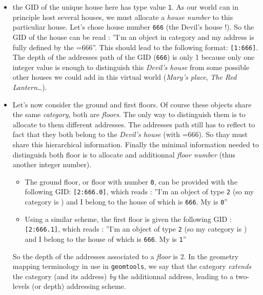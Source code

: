 \begin{itemize}

\item the GID of the unique  house here has type value \texttt{1}.  As
  our world can  in principle host several houses,  we must allocate a
  \emph{house  number} to  this particuliar  house. Let's  chose house
  number \texttt{666} (the  Devil's house !). So the  GID of the house
  can be read : ''I'm an  object in category  and my address
  is fully defined by the =666''. This should lead to
  the following  format: \verb+[1:666]+.   The depth of  the addresses
  path of the  GID (\texttt{666}) is only 1 because only one  integer value is enough
  to distinguish this \emph{Devil's house} from some possible other houses
  we could add in this virtual world (\emph{Mary's place}, \emph{The Red Lantern}\dots).

\item Let's now consider the ground and first floors. Of course these
  objects share the same \emph{category}, both are \emph{floors}.  The
  only  way to  distinguish  them  is to  allocate  to them  different
  addresses.  The  addresses path  still has to  reflect to  fact that
  they    both   belong    to   the    \emph{Devil's    house}   (with
  =666).   So  thay  must  share  this  hierarchical
  information. Finally  the minimal information  needed to distinguish
  both floor is to  allocate and additionnal \emph{floor number} (thus
  another integer number).
  \begin{itemize}
 
  \item  The ground  floor, or  floor with  number \texttt{0},  can be
    provided with  the following GID: \verb+[2:666.0]+,  which reads :
    ''I'm an object of type  \texttt{2} (so my category is )
    and  I  belong  to   the  house  of  which    is
    \texttt{666}.  My  is \texttt{0}''

  \item  Using  a  similar  scheme,  the first  floor  is  given  the
    following GID : \verb+[2:666.1]+, which reads : ''I'm an object of
    type \texttt{2} (so my category is ) and I belong to the
    house   of   which      is   \texttt{666}.    My
     is \texttt{1}''
  \end{itemize}
\pn So the  depth of the addresses associated to  a \emph{floor} is 2.
In the  geometry mapping terminology in use  in \texttt{geomtools}, we
say  that  the     category  \emph{extends}  the  
category   (and   its     address)   \emph{by}   the
additionnal   address, leading  to a  two-levels (or
depth) addressing scheme.


\end{itemize}
